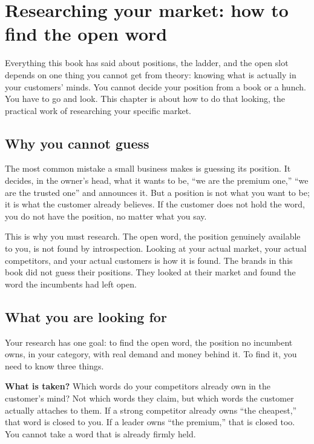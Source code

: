 \documentclass[10pt,twoside,openany]{memoir}
\newcommand{\needspacehead}{\needspace{4\baselineskip}}
\let\oldsection\section
\renewcommand{\section}{\needspacehead\oldsection}
\begin{document}
{\FloatBarrier
\chapter{Researching your market: how to find the open
word}\label{researching-your-market-how-to-find-the-open-word}

Everything this book has said about positions, the ladder, and the open
slot depends on one thing you cannot get from theory: knowing what is
actually in your customers' minds. You cannot decide your position from
a book or a hunch. You have to go and look. This chapter is about how to
do that looking, the practical work of researching your specific market.

\section{Why you cannot guess}\label{why-you-cannot-guess}

The most common mistake a small business makes is guessing its position.
It decides, in the owner's head, what it wants to be, ``we are the
premium one,'' ``we are the trusted one'' and announces it. But a
position is not what you want to be; it is what the customer already
believes. If the customer does not hold the word, you do not have the
position, no matter what you say.

This is why you must research. The open word, the position genuinely
available to you, is not found by introspection. Looking at your actual
market, your actual competitors, and your actual customers is how it is
found. The brands in this book did not guess their positions. They
looked at their market and found the word the incumbents had left open.

\section{What you are looking for}\label{what-you-are-looking-for}

Your research has one goal: to find the open word, the position no
incumbent owns, in your category, with real demand and money behind it.
To find it, you need to know three things.

\textbf{What is taken?} Which words do your competitors already own in
the customer's mind? Not which words they claim, but which words the
customer actually attaches to them. If a strong competitor already owns
``the cheapest,'' that word is closed to you. If a leader owns ``the
premium,'' that is closed too. You cannot take a word that is already
firmly held.

}
\end{document}
